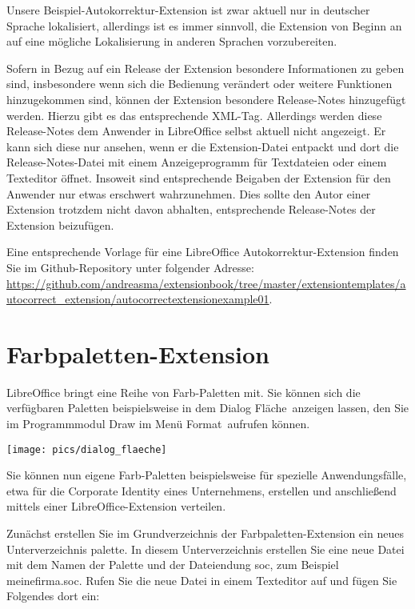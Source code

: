 \documentclass[a4paper,10pt,pagesize,titlepage]{scrbook}
\begin{document}
Unsere Beispiel-Autokorrektur-Extension ist zwar aktuell nur in deutscher Sprache lokalisiert, allerdings ist es immer sinnvoll, die Extension von Beginn an auf eine mögliche Lokalisierung in anderen Sprachen vorzubereiten.

Sofern in Bezug auf ein Release der Extension besondere Informationen zu geben sind, insbesondere wenn sich die Bedienung verändert oder weitere Funktionen hinzugekommen sind, können der Extension besondere Release-Notes hinzugefügt werden. Hierzu gibt es das entsprechende XML-Tag. Allerdings werden diese Release-Notes dem Anwender in LibreOffice selbst aktuell nicht angezeigt. Er kann sich diese nur ansehen, wenn er die Extension-Datei entpackt und dort die Release-Notes-Datei mit einem Anzeigeprogramm für Textdateien oder einem Texteditor öffnet. Insoweit sind entsprechende Beigaben der Extension für den Anwender nur etwas erschwert wahrzunehmen. Dies sollte den Autor einer Extension trotzdem nicht davon abhalten, entsprechende Release-Notes der Extension beizufügen.

Eine entsprechende Vorlage für eine LibreOffice Autokorrektur-Extension finden Sie im Github-Repository unter folgender Adresse:
\url{https://github.com/andreasma/extensionbook/tree/master/extensiontemplates/autocorrect_extension/autocorrectextensionexample01}.


\section{Farbpaletten-Extension}

LibreOffice bringt eine Reihe von Farb-Paletten mit. Sie können sich die verfügbaren Paletten beispielsweise in dem Dialog \glqq Fläche\grqq~anzeigen lassen, den Sie im Programmmodul Draw im Menü \glqq Format\grqq~aufrufen können.

\begin{center}
	\captionsetup{type=figure}
	\texttt{[image: pics/dialog\_flaeche]}
	\label{fig:dialog_flaeche}
\end{center}

Sie können nun eigene Farb-Paletten beispielsweise für spezielle Anwendungsfälle, etwa für die Corporate Identity eines Unternehmens, erstellen und anschließend mittels einer LibreOffice-Extension verteilen.

Zunächst erstellen Sie im Grundverzeichnis der Farbpaletten-Extension ein neues Unterverzeichnis \glqq palette\grqq. In diesem Unterverzeichnis erstellen Sie eine neue Datei mit dem Namen der Palette und der Dateiendung \glqq soc\grqq, zum Beispiel \glqq meinefirma.soc\grqq. Rufen Sie die neue Datei in einem Texteditor auf und fügen Sie Folgendes dort ein:
\end{document}
